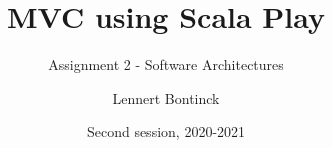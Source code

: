 \title{MVC using Scala Play}
\subtitle{Assignment 2 - Software Architectures}
\author{Lennert Bontinck}
\date{Second session, 2020-2021}

